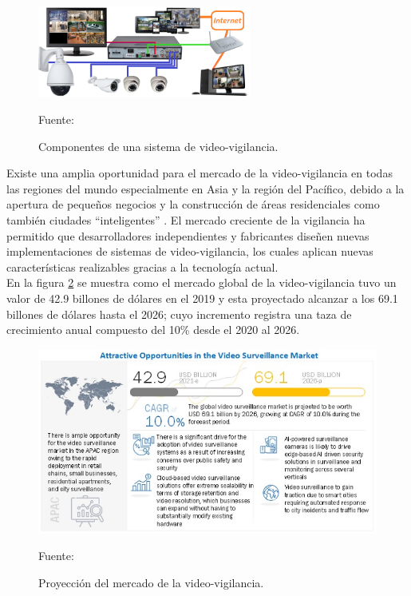 \begin{figure}[H]
    \begin{center}
        \includegraphics[width=7cm]{img/capitulo_2/sis_videovigilancia.png}
        \caption{Componentes de una sistema de video-vigilancia.\\}
        Fuente: \cite{videosurvellance}
        \label{fig:sistema_video_vigilancia}
    \end{center}
    
\end{figure}

Existe una amplia oportunidad para el mercado de la video-vigilancia en todas las regiones del mundo especialmente en Asia y la región del Pacífico, debido a la apertura de pequeños negocios y la construcción de áreas residenciales como también ciudades ``inteligentes'' \cite{marketsandmarkets:market-surveillance}. El mercado creciente de la vigilancia ha permitido que desarrolladores independientes y fabricantes diseñen nuevas implementaciones de sistemas de video-vigilancia, los cuales aplican nuevas características realizables gracias a la tecnología actual.\\

En la figura \ref{fig:surveillance-market} se muestra como el mercado global de la video-vigilancia tuvo un valor de 42.9 billones de dólares en el 2019 y esta proyectado alcanzar a los 69.1 billones de dólares hasta el 2026; cuyo incremento registra una taza de crecimiento anual compuesto del 10\% desde el 2020 al 2026. \cite{marketsandmarkets:market-surveillance}\\

\begin{figure}[H]
    \begin{center}
        \includegraphics[width=12cm]{img/capitulo_2/surveillance-market.jpg}
        \caption{Proyección del mercado de la video-vigilancia.\\}
        Fuente: \cite{marketsandmarkets:market-surveillance}
        \label{fig:surveillance-market}
    \end{center}
\end{figure}

